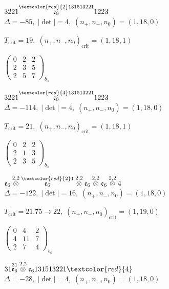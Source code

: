 \documentclass[10pt]{article}
\begin{document}
$3221\overset{\textcolor{red}{2}131513221}{\mathfrak{e}_8}1223$ \quad $\Delta=-85,\; |\det|=4,\; (n_+,n_-,n_0)=(1,18,0)$

\hspace{1em}$T_{\text{crit}}=19,\; (n_+,n_-,n_0)_{\text{crit}}=(1,18,1)$

\hspace{2em}$\left(\begin{smallmatrix}0 & 2 & 2 \\ 2 & 3 & 5 \\ 2 & 5 & 7\end{smallmatrix}\right)_{\!b_0}$

$3221\overset{\textcolor{red}{4}131513221}{\mathfrak{e}_8}1223$ \quad $\Delta=-114,\; |\det|=4,\; (n_+,n_-,n_0)=(1,18,0)$

\hspace{1em}$T_{\text{crit}}=21,\; (n_+,n_-,n_0)_{\text{crit}}=(1,18,1)$

\hspace{2em}$\left(\begin{smallmatrix}0 & 2 & 2 \\ 2 & 1 & 3 \\ 2 & 3 & 5\end{smallmatrix}\right)_{\!b_0}$

\smallskip

$\mathfrak{e}_6\overset{2,2}{\otimes}\overset{\textcolor{red}{2}1}{\mathfrak{e}_6}\overset{2,2}{\otimes}\mathfrak{e}_6\overset{2,2}{\otimes}\mathfrak{e}_6\overset{2,2}{\otimes}4$ \quad $\Delta=-122,\; |\det|=16,\; (n_+,n_-,n_0)=(1,18,0)$

\hspace{1em}$T_{\text{crit}}=21.75 \to 22,\; (n_+,n_-,n_0)_{\text{crit}}=(1,19,0)$

\hspace{2em}$\left(\begin{smallmatrix}0 & 4 & 2 \\ 4 & 11 & 7 \\ 2 & 7 & 4\end{smallmatrix}\right)_{\!b_0}$

\smallskip

$31\overset{31}{\mathfrak{e}_6}\overset{2,2}{\otimes}\mathfrak{e}_6131513221\textcolor{red}{4}$ \quad $\Delta=-28,\; |\det|=4,\; (n_+,n_-,n_0)=(1,18,0)$
\end{document}
